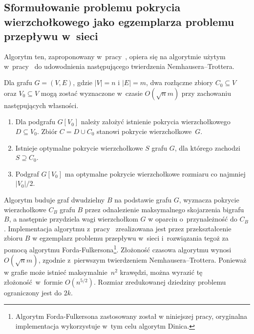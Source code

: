 \subsection{Sformułowanie problemu pokrycia wierzchołkowego jako egzemplarza problemu przepływu w~sieci}\label{Kernelization_network_flow}
Algorytm ten, zaproponowany w~pracy~\cite{KernelizationAlgorithms04}, opiera się na
algorytmie użytym w~pracy~\cite{Niedermeier02} do udowodnienia następującego twierdzenia
Nemhausera--Trottera.

\begin{theorem}
  Dla grafu $G=(V,E)$, gdzie $|V|=n$ i $|E|=m$, dwa rozłączne zbiory $C_0 \subseteq V$ oraz $V_0 \subseteq V$ mogą zostać wyznaczone w~czasie $O(\sqrt{n}m)$ przy zachowaniu następujących własności.
  \begin{enumerate}
    \item Dla podgrafu $G[V_0]$ należy założyć istnienie pokrycia wierzchołkowego $D \subseteq V_0$.
    Zbiór $C = D \cup C_0$ stanowi pokrycie wierzchołkowe~$G$.
    \item Istnieje optymalne pokrycie wierzchołkowe $S$ grafu $G$, dla którego zachodzi $S \supseteq C_0$.
    \item Podgraf $G[V_0]$ ma optymalne pokrycie wierzchołkowe rozmiaru co najmniej $|V_0|/2$. 
  \end{enumerate}
\end{theorem}

Algorytm buduje graf dwudzielny $B$ na podstawie grafu $G$, wyznacza pokrycie wierzchołkowe $C_B$ grafu $B$ przez odnalezienie maksymalnego skojarzenia bigrafu $B$,
a następnie przydziela wagi wierzchołkom $G$ w oparciu o~przynależność do $C_B$.
Implementacja algorytmu z~pracy~\cite{Niedermeier02} zrealizowana jest przez
przekształcenie zbioru $B$ w egzemplarz problemu przepływu w~sieci i~rozwiązania tegoż za pomocą algorytmu Forda-Fulkersona\footnote{Algorytm Forda-Fulkersona
  zastosowany został w niniejszej pracy, oryginalna implementacja wykorzystuje w~tym celu algorytm Dinica.}.
Złożoność czasowa algorytmu wynosi $O(\sqrt{n}m)$, zgodnie z~pierwszym twierdzeniem Nemhausera--Trottera. 
Ponieważ w grafie może istnieć maksymalnie~$n^2$ krawędzi, można wyrazić tę złożoność~w~formie $O(n^{5/2})$.
Rozmiar zredukowanej dziedziny problemu ograniczony jest do $2k$.

